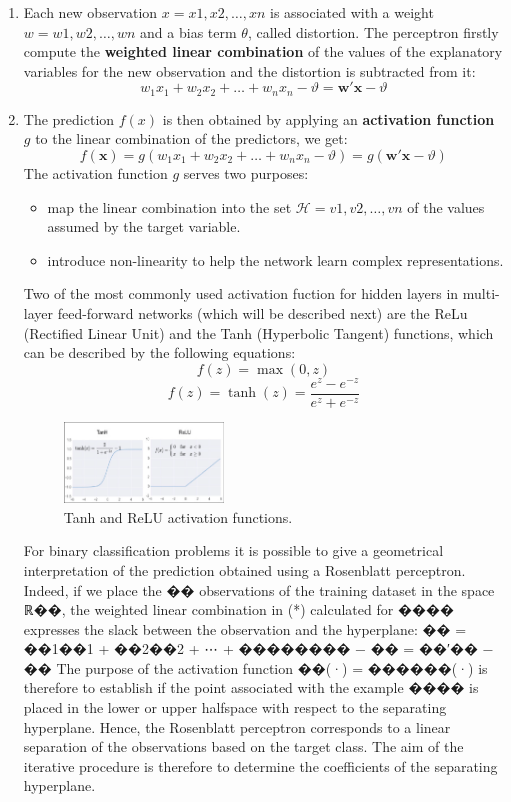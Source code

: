 \begin{enumerate}
    \item Each new observation $x = {x1, x2, \dots, xn}$ is associated with a weight $w = {w1, w2, \dots, wn}$ and a bias term $\theta$, called distortion. The perceptron firstly compute the \textbf{weighted linear combination} of the values of the explanatory variables for the new observation and the distortion is subtracted from it:
    \[
    w_1 x_1 + w_2 x_2 + \dots + w_n x_n - \vartheta = \mathbf{w}' \mathbf{x} - \vartheta
    \]
    \item The prediction $f(x)$ is then obtained by applying an \textbf{activation function} $g$ to the linear combination of the predictors, we get:
    \[
    f(\mathbf{x}) = g(w_1 x_1 + w_2 x_2 + \dots + w_n x_n - \vartheta) = g(\mathbf{w}' \mathbf{x} - \vartheta)
    \]
    The activation function $g$ serves two purposes:
    \begin{itemize}
        \addtolength{\leftskip}{2em}
        \item map the linear combination into the set $\mathcal{H} = {v1, v2, \dots, vn}$ of the values assumed by the target variable. 
        \item introduce non-linearity to help the network learn complex representations. 
    \end{itemize}
    Two of the most commonly used activation fuction for hidden layers in multi-layer feed-forward networks (which will be described next) are the ReLu (Rectified Linear Unit) and the Tanh (Hyperbolic Tangent) functions, which can be described by the following equations:     
    \[
    f(z) = \max(0, z)
    \]
    \[
    f(z) = \tanh(z) = \frac{e^z - e^{-z}}{e^z + e^{-z}}
    \]
    \begin{figure}[H] 
    \centering
    \includegraphics[width=0.4\textwidth]{Machine_learning_thesis/Images/Tanh-and-ReLU-activation-functions.png}
    \caption{Tanh and ReLU activation functions.} 
    \label{fig:Tanh and ReLU activation functions} 
\end{figure}
    For binary classification problems it is possible to give a geometrical interpretation of the prediction obtained using a Rosenblatt perceptron. Indeed, if we place the �� observations of the training dataset in the space ℝ��, the weighted linear combination in (*) calculated for ����
     expresses the slack between the observation and the hyperplane:
     �� = ��1��1 + ��2��2 + ⋯ + �������� − �� = ��′�� − ��
    The purpose of the activation function ��(·) = ������(·) is therefore to establish if the point associated with the example ���� is placed in the lower or upper halfspace with respect to the separating hyperplane. Hence, the Rosenblatt perceptron corresponds to a linear separation of the observations based on the target class. The aim of the iterative procedure is therefore to determine the coefficients of the separating hyperplane. 


\end{enumerate}
